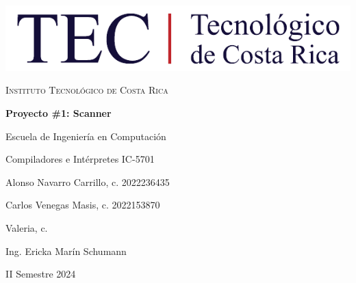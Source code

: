 \documentclass[a4paper,12pt]{article}
\begin{document}
\begin{titlepage}
    \centering
    \vspace*{0.5cm}

    \includegraphics[width=1\textwidth]{logo-tec.png}\par\vspace{1cm}

    {\scshape Instituto Tecnológico de Costa Rica\par}
    \vspace{2cm}

    {\Huge\bfseries Proyecto \#1: Scanner\par}
    \vspace{2cm}

    {\large Escuela de Ingeniería en Computación\par}

    {\large Compiladores e Intérpretes IC-5701\par}
    \vspace{2cm}

    {\large Alonso Navarro Carrillo, c. 2022236435\par}
    \vspace{0.25cm}
    {\large Carlos Venegas Masis, c. 2022153870 \par}
    \vspace{0.25cm}
    {\large Valeria, c. \par}
    \vspace{2cm}

    \vfill

    {\large Ing. Ericka Marín Schumann\par}

    {II Semestre 2024\par}
\end{titlepage}

\tableofcontents\newpage

\end{document}
